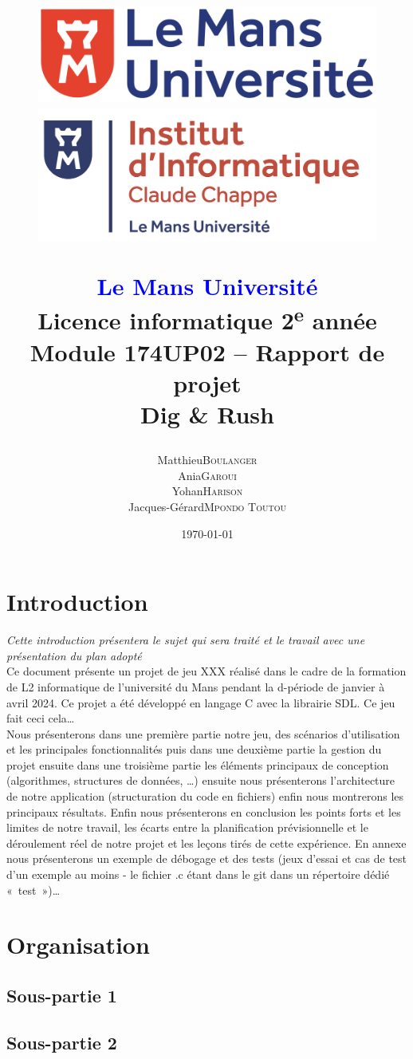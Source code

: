 \documentclass[a4paper,12pt]{article}
\title{
    \begin{figure}[!t]
	\begin{minipage}{.25\textwidth}
	    \includegraphics[width=\textwidth]{img/logo_lmu.png}
	\end{minipage}
	\hspace{.5\textwidth}
	\begin{minipage}{.25\textwidth}
	    \includegraphics[width=\textwidth]{img/logo_ic2.png}
	\end{minipage}
    \end{figure}
    \begin{center}
	\textbf{\textcolor{blue}{Le Mans Université}} \\
	Licence informatique 2\textsuperscript{e} année \\
	Module 174UP02 – Rapport de projet \\
	\textbf{Dig \& Rush}
    \end{center}
}
\author{
	\begin{tabular}{rl}
	    Matthieu & \textsc{Boulanger} \\
	    Ania & \textsc{Garoui} \\
	    Yohan & \textsc{Harison} \\
	    Jacques-Gérard & \textsc{Mpondo Toutou}
	\end{tabular}
}
\date{\today}
\begin{document}
\maketitle
\newpage

\tableofcontents
\newpage


\section{Introduction}

\textit{Cette introduction présentera le sujet qui sera traité et le travail avec une présentation du plan adopté} \\
Ce document présente un projet de jeu XXX réalisé dans le cadre de la formation de L2 informatique de l’université du Mans pendant la d-période de janvier à avril 2024.
Ce projet a été développé en langage C avec la librairie SDL.
Ce jeu fait ceci cela… \\
Nous présenterons dans une première partie notre jeu, des scénarios d’utilisation et les principales fonctionnalités puis dans une deuxième partie la gestion du projet ensuite dans une troisième partie les éléments principaux de conception (algorithmes, structures de données, …) ensuite nous présenterons l’architecture de notre application (structuration du code en fichiers) enfin nous montrerons les principaux résultats.
Enfin nous présenterons en conclusion les points forts et les limites de notre travail, les écarts entre la planification prévisionnelle et le déroulement réel de notre projet et les leçons tirés de cette expérience. En annexe nous présenterons un exemple de débogage et des tests (jeux d’essai et cas de test d’un exemple au moins - le fichier .c étant dans le git dans un répertoire dédié « test »)…



\section{Organisation}

\subsection{Sous-partie 1}

\subsection{Sous-partie 2}
\end{document}
